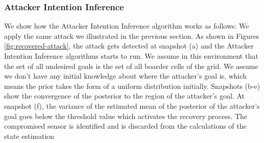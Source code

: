 \documentclass[letterpaper, 10 pt, conference]{ieeeconf}  %
\begin{document}
\subsubsection{Attacker Intention Inference}
We show how the Attacker Intention Inference algorithm works as follows: We apply the same attack we illustrated in the previous section. As shown in Figures \ref{fig:recovered-attack}, the attack gets detected at snapshot (a) and the Attacker Intention Inference algorithms starts to run. We assume in this environment that the set of all undesired goals is the set of all boarder cells of the grid. We assume we don't have any initial knowledge about where the attacker's goal is, which means the prior takes the form of a uniform distribution initially. Snapshots (b-e) show the convergence of the posterior to the region of the attacker's goal. At snapshot (f), the variance of the estimated mean of the posterior of the attacker's goal goes below the threshold value which activates the recovery process. The compromised sensor is identified and is discarded from the calculations of the state estimation
\end{document}
